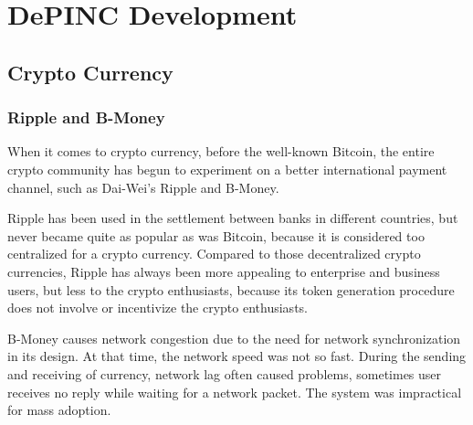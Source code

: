 \chapter{DePINC Development}
\section{Crypto Currency}
\subsection{Ripple and B-Money}
\begin{flushleft}
    When it comes to crypto currency, before the well-known Bitcoin, the entire crypto community has begun to experiment on a better international payment channel, such as Dai-Wei's Ripple and B-Money.
\end{flushleft}
\begin{flushleft}
    Ripple has been used in the settlement between banks in different countries, but never became quite as popular as was Bitcoin, because it is considered too centralized for a crypto currency. Compared to those decentralized crypto currencies, Ripple has always been more appealing to enterprise and business users, but less to the crypto enthusiasts, because its token generation procedure does not involve or incentivize the crypto enthusiasts.
\end{flushleft}
\begin{flushleft}
    B-Money causes network congestion due to the need for network synchronization in its design. At that time, the network speed was not so fast. During the sending and receiving of currency, network lag often caused problems, sometimes user receives no reply while waiting for a network packet. The system was impractical for mass adoption.
\end{flushleft}
